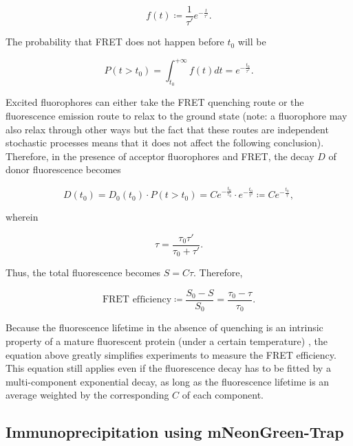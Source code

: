 \begin{equation*}
    f(t) \coloneqq \dfrac{1}{\tau'} e^{-\frac{t}{\tau'}}.
\end{equation*}

\noindent The probability that FRET does not happen before $t_0$ will be

\begin{equation*}
    P(t > t_0) = \int_{t_0}^{+\infty} f(t) dt = e^{-\frac{t_0}{\tau'}}.
\end{equation*}

\noindent Excited fluorophores can either take the FRET quenching route or the fluorescence emission route to relax to the ground state (note: a fluorophore may also relax through other ways but the fact that these routes are independent stochastic processes means that it does not affect the following conclusion). Therefore, in the presence of acceptor fluorophores and FRET, the decay $D$ of donor fluorescence becomes

\begin{equation*}
    D(t_0) =  D_0(t_0) \cdot P(t > t_0) = C e^{-\frac{t_0}{\tau_0}} \cdot e^{-\frac{t_0}{\tau'}} \coloneqq C e^{-\frac{t_0}{\tau}},
\end{equation*}

\noindent wherein

\begin{equation*}
    \tau = \dfrac{\tau_0\tau'}{\tau_0 + \tau'}.
\end{equation*}

Thus, the total fluorescence becomes $S =  C\tau$. Therefore,

\begin{equation*}
    \text{FRET efficiency} \coloneqq \frac{S_0-S}{S_0} = \frac{\tau_0-\tau}{\tau_0}.
\end{equation*}

Because the fluorescence lifetime in the absence of quenching is an intrinsic property of a mature fluorescent protein (under a certain temperature) \cite{FLTIsIntrinsic}, the equation above greatly simplifies experiments to measure the FRET efficiency. This equation still applies even if the fluorescence decay has to be fitted by a multi-component exponential decay, as long as the fluorescence lifetime is an average weighted by the corresponding $C$ of each component.

\subsection{Immunoprecipitation using mNeonGreen-Trap}
\label{mNGTrapMethod}

